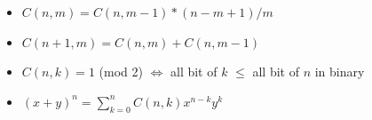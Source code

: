 \begin{itemize}
    \item $C(n, m) = C(n, m - 1) * (n - m + 1) / m$
    \item $C(n + 1, m) = C(n, m) + C(n, m - 1)$
    \item $C(n, k) = 1$ (mod 2) $\Leftrightarrow$ all bit of $k$ $\leq$ all bit of $n$ in binary
    \item $(x+y)^n = \sum_{k=0}^{n} C(n,k) x^{n-k} y^k$
\end{itemize}